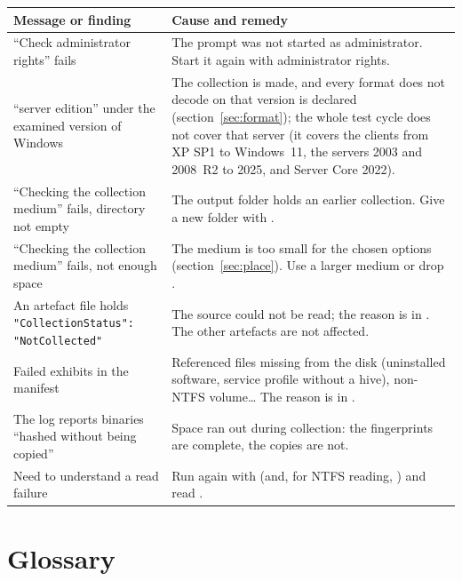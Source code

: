 \documentclass[11pt,a4paper,oneside]{report}
\begin{document}
\begin{longtable}{@{}L{5cm}L{9.4cm}@{}}
\toprule
\bfseries Message or finding & \bfseries Cause and remedy \\
\midrule
\endhead
``Check administrator rights'' fails & The prompt was not started as
  administrator. Start it again with administrator rights. \\
``server edition'' under the examined version of Windows & The
  collection is made, and every format \wac{} does not decode on that version
  is declared (section~\ref{sec:format}); the whole test cycle does not cover
  that server (it covers the clients from XP SP1 to Windows~11, the servers 2003
  and 2008~R2 to 2025, and Server Core 2022). \\
``Checking the collection medium'' fails, directory not empty & The output
  folder holds an earlier collection. Give a new folder with . \\
``Checking the collection medium'' fails, not enough space & The medium is too
  small for the chosen options (section~\ref{sec:place}). Use a larger medium or
  drop . \\
An artefact file holds \texttt{"CollectionStatus": "NotCollected"} & The source
  could not be read; the reason is in . The other artefacts are not
  affected. \\
Failed exhibits in the manifest & Referenced files missing from the disk
  (uninstalled software, service profile without a hive), non-NTFS
  volume\ldots{} The reason is in . \\
The log reports binaries ``hashed without being copied'' & Space ran out during
  collection: the fingerprints are complete, the copies are not. \\
Need to understand a read failure & Run again with  (and, for
  NTFS reading, ) and read . \\
\bottomrule
\end{longtable}

\appendix

\chapter{Glossary}
\end{document}
